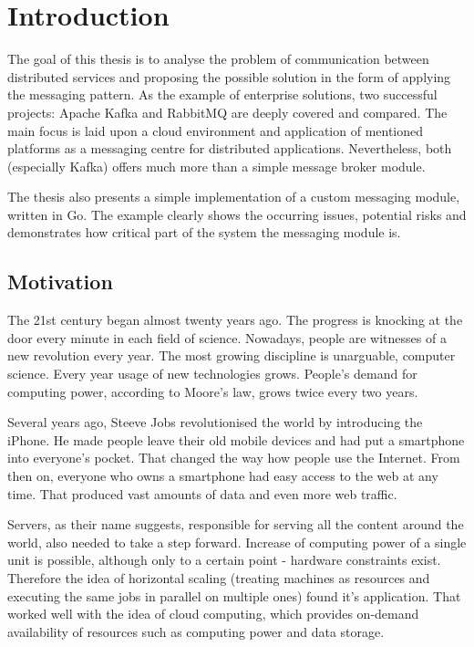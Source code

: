 \chapter{Introduction}
\label{cha:Introduction}

The goal of this thesis is to analyse the problem of communication between distributed services and proposing the possible solution in the form of applying the messaging pattern. As the example of enterprise solutions, two successful projects: Apache Kafka and RabbitMQ are deeply covered and compared. The main focus is laid upon a cloud environment and application of mentioned platforms as a messaging centre for distributed applications. Nevertheless, both (especially Kafka) offers much more than a simple message broker module.

The thesis also presents a simple implementation of a custom messaging module, written in Go. The example clearly shows the occurring issues, potential risks and demonstrates how critical part of the system the messaging module is. 

\section{Motivation}
\label{sec:Motivation}

The 21st century began almost twenty years ago. The progress is knocking at the door every minute in each field of science. Nowadays, people are witnesses of a new revolution every year. The most growing discipline is unarguable, computer science. Every year usage of new technologies grows. People's demand for computing power, according to Moore's law\cite{moore}, grows twice every two years.

Several years ago, Steeve Jobs revolutionised the world by introducing the iPhone. He made people leave their old mobile devices and had put a  smartphone into everyone's pocket. That changed the way how people use the Internet. From then on, everyone who owns a smartphone had easy access to the web at any time. That produced vast amounts of data and even more web traffic. 

Servers,  as their name suggests, responsible for serving all the content around the world, also needed to take a step forward. Increase of computing power of a single unit is possible, although only to a certain point - hardware constraints exist. Therefore the idea of horizontal scaling (treating machines as resources and executing the same jobs in parallel on multiple ones) found it's application. That worked well with the idea of cloud computing, which provides on-demand availability of resources such as computing power and data storage.


